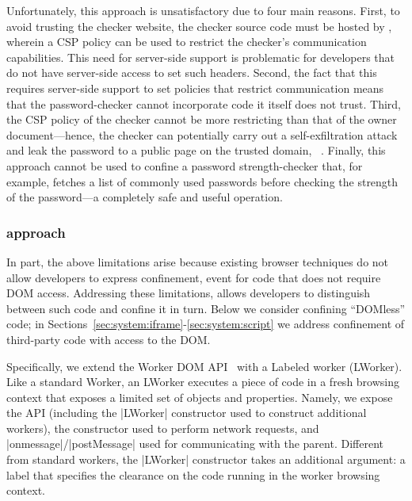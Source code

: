 Unfortunately, this approach is unsatisfactory due to four main reasons.
%
First, to avoid trusting the checker website, the checker source code
must be hosted by , wherein a CSP policy can be used
to restrict the checker's communication capabilities. 
%
This need for server-side support is problematic for developers that
do not have server-side access to set such headers.
%
Second, the fact that this requires server-side support to set
policies that restrict communication means that the password-checker
cannot incorporate code it itself does not trust.
%
Third, the CSP policy of the checker cannot be more restricting than
that of the owner document---hence, the checker can potentially carry
out a self-exfiltration attack and leak the password to a public page
on the trusted domain, ~.
%
Finally, this approach cannot be used to confine a password
strength-checker that, for example, fetches a list of commonly used
passwords before checking the strength of the password---a completely
safe and useful operation.

\subsubsection{\sys{} approach}
%
In part, the above limitations arise because existing browser
techniques do not allow developers to express confinement, event for
code that does not require DOM access.
%
Addressing these limitations, \sys{} allows developers to distinguish
between such code and confine it in turn.
%
Below we consider confining ``DOMless'' code; in
Sections~\ref{sec:system:iframe}-\ref{sec:system:script} we address
confinement of third-party code with access to the DOM.

Specifically, we extend the Worker DOM API~ with a
Labeled worker (LWorker).
%
Like a standard Worker, an LWorker executes a piece of code in a fresh
browsing context that exposes a limited set of objects and properties.
%
Namely, we expose the \sys{} API (including the \js|LWorker|
constructor used to construct additional workers), the \xhr{}
constructor used to perform network requests, and
\js|onmessage|/\js|postMessage| used for communicating with the
parent.
%
Different from standard workers, the \js|LWorker| constructor takes an
additional argument: a label that specifies the clearance on the code
running in the worker browsing context.

